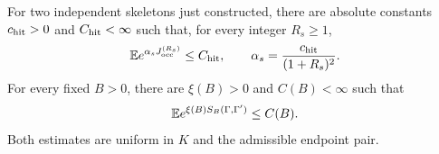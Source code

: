 \begin{lemma}\label{lem:skeleton}
For two independent skeletons just constructed, there are absolute
constants $c_{\rm hit}>0$ and $C_{\rm hit}<\infty$ such that, for every
integer $R_s\ge1$,
\begin{equation}\label{lattice:imported-hit}
 \mathbb E e^{\alpha_sJ_{\rm occ}^{(R_s)}}\le C_{\rm hit},
 \qquad \alpha_s=\frac{c_{\rm hit}}{(1+R_s)^2}.
\end{equation}
For every fixed $B>0$, there are $\xi(B)>0$ and $C(B)<\infty$ such that
\begin{equation}\label{lattice:imported-soft}
 \mathbb E e^{\xi(B)S_B(\Gamma,\Gamma')}\le C(B).
\end{equation}
Both estimates are uniform in $K$ and the admissible endpoint pair.
\end{lemma}
